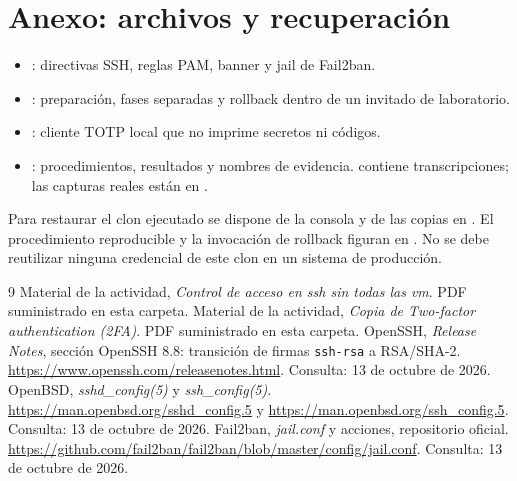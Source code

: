 \documentclass[11pt,a4paper]{article}
\begin{document}
\section{Anexo: archivos y recuperación}
\begin{itemize}[noitemsep]
\item {}: directivas SSH, reglas PAM, banner y jail de Fail2ban.
\item {}: preparación, fases separadas y rollback
dentro de un invitado de laboratorio.
\item {}: cliente TOTP local que no imprime
secretos ni códigos.
\item {}: procedimientos, resultados y nombres de
evidencia.  contiene transcripciones; las capturas reales
están en .
\end{itemize}
Para restaurar el clon ejecutado se dispone de la consola y de las copias en
. El procedimiento reproducible y la
invocación de rollback figuran en . No se debe reutilizar
ninguna credencial de este clon en un sistema de producción.

\begin{thebibliography}{9}
Material de la actividad, \emph{Control de acceso en ssh sin todas las vm}.
PDF suministrado en esta carpeta.
Material de la actividad, \emph{Copia de Two-factor authentication (2FA)}.
PDF suministrado en esta carpeta.
OpenSSH, \emph{Release Notes}, sección OpenSSH 8.8: transición de firmas
\texttt{ssh-rsa} a RSA/SHA-2.
\url{https://www.openssh.com/releasenotes.html}.
Consulta: 13 de octubre de 2026.
OpenBSD, \emph{sshd\_config(5)} y \emph{ssh\_config(5)}.
\url{https://man.openbsd.org/sshd_config.5} y
\url{https://man.openbsd.org/ssh_config.5}.
Consulta: 13 de octubre de 2026.
Fail2ban, \emph{jail.conf} y acciones, repositorio oficial.
\url{https://github.com/fail2ban/fail2ban/blob/master/config/jail.conf}.
Consulta: 13 de octubre de 2026.
\end{thebibliography}
\end{document}
